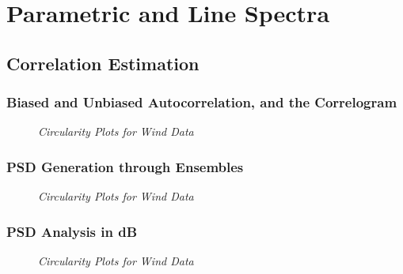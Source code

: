 \documentclass[./main.tex]{subfiles}
\begin{document}
\section{Parametric and Line Spectra}

\subsection{Correlation Estimation}

\subsubsection{Biased and Unbiased Autocorrelation, and the Correlogram}

\begin{figure}[h]
	\centering 
	\resizebox{\textwidth}{!}{}
	\caption{\textit{Circularity Plots for Wind Data}}
	\label{fig:2_1_a}
\end{figure}


\subsubsection{PSD Generation through Ensembles}

\begin{figure}[h]
	\centering 
	\resizebox{\textwidth}{!}{}
	\caption{\textit{Circularity Plots for Wind Data}}
	\label{fig:2_1_b}
\end{figure}

\subsubsection{PSD Analysis in dB}

\begin{figure}[h]
	\centering 
	\resizebox{\textwidth}{!}{}
	\caption{\textit{Circularity Plots for Wind Data}}
	\label{fig:2_1_c}
\end{figure}






\end{document}
